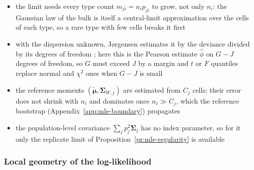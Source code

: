 \begin{itemize}
\begin{itemize}
          Section~\ref{sec:generalized-linear-model} becomes efficient in this limit; the proof is to be written
    \item the limit needs every type count \(m_{ji}=n_{i}p_{ji}\) to grow, not only \(n_{i}\): the Gaussian law of
          the bulk is itself a central-limit approximation over the cells of each type, so a rare type
          with few cells breaks it first
    \item with the dispersion unknown, J{\o}rgensen estimates it by the deviance divided by its degrees of
          freedom \cite[Sect.~4.5]{jørgensenSmallDispersionAsymptotics1987}; here this is the Pearson estimate
          \(\hat\phi\) on \(G-J\) degrees of freedom, so \(G\) must exceed \(J\) by a margin and \(t\) or \(F\)
          quantiles replace normal and \(\chi^{2}\) ones when \(G-J\) is small
    \item the reference moments \((\tilde{\boldsymbol{\mu}},\boldsymbol{\Sigma}_{W,j})\) are estimated from \(C_{j}\) cells; their error does
          not shrink with \(n_{i}\) and dominates once \(n_{i}\gg C_{j}\), which the reference bootstrap
          (Appendix~\ref{app:mle-boundary}) propagates
    \item the population-level covariance \(\sum_{j}p_{j}^{2}\boldsymbol{\Sigma}_{j}\) has no index parameter, so for it only the
          replicate limit of Proposition~\ref{pr:mle-regularity} is available
  \end{itemize}
\end{itemize}

\subsubsection{Local geometry of the log-likelihood}
\label{app:mle-geometry}

